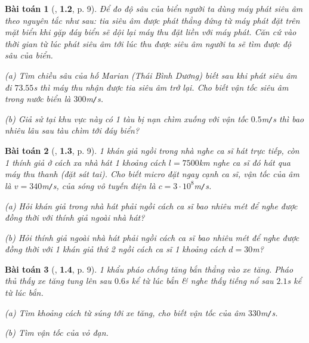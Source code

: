\documentclass{article}
\numberwithin{equation}{section}
\newtheorem{baitoan}{Bài toán}[section]
\begin{document}
\begin{baitoan}[\cite{Van2022}, \textbf{1.2}, p. 9]
	Để đo độ sâu của biển người ta dùng máy phát siêu âm theo nguyên tắc như sau: tia siêu âm được phát thẳng đứng từ máy phát đặt trên mặt biển khi gặp đáy biển sẽ dội lại máy thu đặt liền với máy phát. Căn cứ vào thời gian từ lúc phát siêu âm tới lúc thu được siêu âm người ta sẽ tìm được độ sâu của biển.
	\begin{enumerate*}
		\item[(a)] Tìm chiều sâu của hố Marian (Thái Bình Dương) biết sau khi phát siêu âm đi $73.55$\emph{s} thì máy thu nhận được tia siêu âm trở lại. Cho biết vận tốc siêu âm trong nước biển là $300$\emph{m\texttt{/}s}.
		\item[(b)] Giả sử tại khu vực này có 1 tàu bị nạn chìm xuống với vận tốc $0.5$\emph{m\texttt{/}s} thì bao nhiêu lâu sau tàu chìm tới đáy biển?
	\end{enumerate*}
\end{baitoan}

\begin{baitoan}[\cite{Van2022}, \textbf{1.3}, p. 9]
	1 khán giả ngồi trong nhà nghe ca sĩ hát trực tiếp, còn 1 thính giả ở cách xa nhà hát 1 khoảng cách $l = 7500$\emph{km} nghe ca sĩ đó hát qua máy thu thanh (đặt sát tai). Cho biết micro đặt ngay cạnh ca sĩ, vận tốc của âm là $v = 340$\emph{m\texttt{/}s}, của sóng vô tuyến điện là $c = 3\cdot 10^8$\emph{m\texttt{/}s}.
	\begin{enumerate*}
		\item[(a)] Hỏi khán giả trong nhà hát phải ngồi cách ca sĩ bao nhiêu mét để nghe được đồng thời với thính giả ngoài nhà hát?
		\item[(b)] Hỏi thính giả ngoài nhà hát phải ngồi cách ca sĩ bao nhiêu mét để nghe được đồng thời với 1 khán giả thứ 2 ngồi cách ca sĩ 1 khoảng cách $d = 30$\emph{m}?
	\end{enumerate*}
\end{baitoan}

\begin{baitoan}[\cite{Van2022}, \textbf{1.4}, p. 9]
	1 khẩu pháo chống tăng bắn thẳng vào xe tăng. Pháo thủ thấy xe tăng tung lên sau $0.6$\emph{s} kể từ lúc bắn \& nghe thấy tiếng nổ sau $2.1$\emph{s} kể từ lúc bắn.
	\begin{enumerate*}
		\item[(a)] Tìm khoảng cách từ súng tới xe tăng, cho biết vận tốc của âm $330$\emph{m\texttt{/}s}.
		\item[(b)] Tìm vận tốc của vỏ đạn.
	\end{enumerate*}
\end{baitoan}
\end{document}
